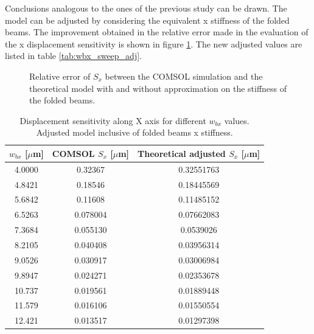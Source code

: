 \documentclass[lettersize,journal]{IEEEtran}
\begin{document}
    Conclusions analogous to the ones of the previous study can be drawn. The model can be adjusted by considering the equivalent x stiffness of the folded beams. The improvement obtained in the relative error made in the evaluation of the x displacement sensitivity is shown in figure \ref{plt:wbx_errors}. The new adjusted values are listed in table \ref{tab:wbx_sweep_adj}.
    
    \begin{figure}[!h]
        \centering
        
        \caption{Relative error of \(S_x\) between the COMSOL simulation and the theoretical model with and without approximation on the stiffness of the folded beams.}
        \label{plt:wbx_errors}
    \end{figure}
    
    \begin{table}[h]
        \caption{Displacement sensitivity along X axis for different \(w_{bx}\) values. Adjusted model inclusive of folded beams x stiffness.}
        \renewcommand{\arraystretch}{1.2}
        \centering
        \begin{tabular}{|c|c|c|}
            \hline
            \textbf{\(w_{bx}\) [\(\mu\)m]} & \textbf{COMSOL \(S_x\) [\(\mu\)m]} & \textbf{Theoretical adjusted \(S_x\) [\(\mu\)m]}\\ \hline
            4.0000       & 0.32367      & 0.32551763                  \\ \hline
            4.8421       & 0.18546     & 0.18445569                   \\ \hline
            5.6842       & 0.11608     & 0.11485152                  \\ \hline
            6.5263       & 0.078004     & 0.07662083                  \\ \hline
            7.3684       & 0.055130     & 0.0539026                   \\ \hline
            8.2105       & 0.040408     & 0.03956314                \\ \hline
            9.0526       & 0.030917     & 0.03006984                    \\ \hline
            9.8947       & 0.024271     & 0.02353678                  \\ \hline
            10.737       & 0.019561     & 0.01889448                  \\ \hline
            11.579       & 0.016106     & 0.01550554                  \\ \hline
            12.421       & 0.013517     & 0.01297398                 \\ \hline

\end{tabular}
\end{table}
\end{document}
